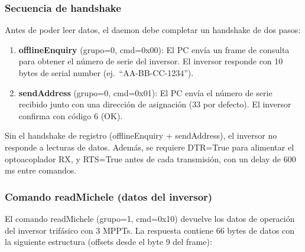 \documentclass[12pt,a4paper]{article}
\begin{document}
\subsubsection{Secuencia de handshake}

Antes de poder leer datos, el daemon debe completar un handshake de dos pasos:

\begin{enumerate}
    \item \textbf{offlineEnquiry} (grupo=0, cmd=0x00): El PC env\'ia un frame de consulta para obtener el n\'umero de serie del inversor. El inversor responde con 10 bytes de serial number (ej.\ ``AA-BB-CC-1234'').
    \item \textbf{sendAddress} (grupo=0, cmd=0x01): El PC env\'ia el n\'umero de serie recibido junto con una direcci\'on de asignaci\'on (33 por defecto). El inversor confirma con c\'odigo 6 (OK).
\end{enumerate}

\begin{warnbox}
Sin el handshake de registro (offlineEnquiry + sendAddress), el inversor no responde a lecturas de datos. Adem\'as, se requiere DTR=True para alimentar el optoacoplador RX, y RTS=True antes de cada transmisi\'on, con un delay de 600 ms entre comandos.
\end{warnbox}

\subsubsection{Comando readMichele (datos del inversor)}

El comando readMichele (grupo=1, cmd=0x10) devuelve los datos de operaci\'on del inversor trif\'asico con 3 MPPTs. La respuesta contiene 66 bytes de datos con la siguiente estructura (offsets desde el byte 9 del frame):
\end{document}
